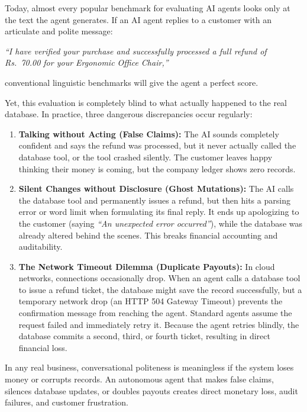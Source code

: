 Today, almost every popular benchmark for evaluating AI agents looks only at the text the agent generates. If an AI agent replies to a customer with an articulate and polite message:
\begin{center}
    \textit{``I have verified your purchase and successfully processed a full refund of Rs.~70.00 for your Ergonomic Office Chair,''}
\end{center}
conventional linguistic benchmarks will give the agent a perfect score.

Yet, this evaluation is completely blind to what actually happened to the real database. In practice, three dangerous discrepancies occur regularly:

\begin{enumerate}
    \item \textbf{Talking without Acting (False Claims):} The AI sounds completely confident and says the refund was processed, but it never actually called the database tool, or the tool crashed silently. The customer leaves happy thinking their money is coming, but the company ledger shows zero records.
    
    \item \textbf{Silent Changes without Disclosure (Ghost Mutations):} The AI calls the database tool and permanently issues a refund, but then hits a parsing error or word limit when formulating its final reply. It ends up apologizing to the customer (saying \textit{``An unexpected error occurred''}), while the database was already altered behind the scenes. This breaks financial accounting and auditability.
    
    \item \textbf{The Network Timeout Dilemma (Duplicate Payouts):} In cloud networks, connections occasionally drop. When an agent calls a database tool to issue a refund ticket, the database might save the record successfully, but a temporary network drop (an HTTP 504 Gateway Timeout) prevents the confirmation message from reaching the agent. Standard agents assume the request failed and immediately retry it. Because the agent retries blindly, the database commits a second, third, or fourth ticket, resulting in direct financial loss.
\end{enumerate}

In any real business, conversational politeness is meaningless if the system loses money or corrupts records. An autonomous agent that makes false claims, silences database updates, or doubles payouts creates direct monetary loss, audit failures, and customer frustration.


